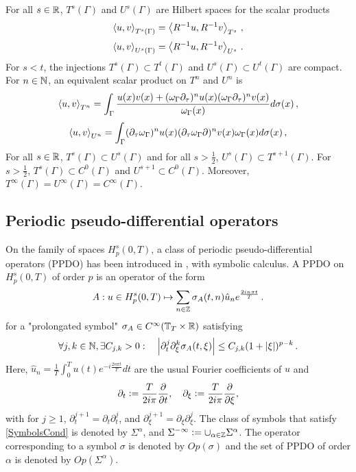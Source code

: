 \documentclass[a4paper]{article}
\begin{document}
\begin{The} For all $s \in \mathbb{R}$, $T^s(\Gamma)$ and $U^s(\Gamma)$ are Hilbert spaces for the scalar products 
\[\left\langle u,v\right\rangle_{T^s(\Gamma)} = \left\langle R^{-1}u,R^{-1}v\right\rangle_{T^s}\,,\]
\[\left\langle u,v\right\rangle_{U^s(\Gamma)} = \left\langle R^{-1}u,R^{-1}v\right\rangle_{U^s}\,.\]
For $s < t$, the injections $T^s(\Gamma) \subset T^t(\Gamma)$ and $U^s(\Gamma) \subset U^t(\Gamma)$ are compact. For $n \in \mathbb{N}$, an equivalent scalar product on $T^n$ and $U^n$ is 
\[\left\langle u,v\right\rangle_{T^n} = \int_{\Gamma} \frac{u(x)v(x) + (\omega_\Gamma \partial_\tau)^n u(x) (\omega_\Gamma \partial_\tau)^n v(x)}{\omega_\Gamma(x)}d\sigma(x)\,,\]
\[\left\langle u,v\right\rangle_{U^n} = \int_{\Gamma}(\partial_\tau\omega_\Gamma )^n u(x) (\partial_\tau\omega_\Gamma \partial)^n v(x)\omega_\Gamma(x)d\sigma(x)\,,\]
For all $s \in \mathbb{R}$, $T^s(\Gamma) \subset U^s(\Gamma)$ and for all $s > \frac{1}{2}$, $U^s(\Gamma) \subset T^{s+1}(\Gamma)$. For $s > \frac{1}{2}$, $T^s(\Gamma) \subset C^0(\Gamma)$ and $U^{s+1} \subset C^0(\Gamma)$. Moreover, $T^\infty(\Gamma) = U^\infty(\Gamma) = C^\infty(\Gamma)$. 
\end{The}

\subsection{Periodic pseudo-differential operators}

On the family of spaces $H^s_p(0,T)$, a class of periodic pseudo-differential operators (PPDO) has been introduced in \cite{thrunen1998symbol}, with symbolic calculus. A PPDO on $H^s_p(0,T)$ of order $p$ is an operator of the form 
\[A : u \in H^s_p(0,T) \mapsto \sum_{n \in \mathbb{Z}} \sigma_A(t,n) \hat{u}_n e^{\frac{2in\pi t}{T} }\,.\]
for a "prolongated symbol" $\sigma_A \in C^{\infty}(\mathbb{T}_T \times \mathbb{R})$ satisfying 
\begin{equation}
\label{SymbolsCond}
	\forall j,k \in \mathbb{N}, \exists C_{j,k} >0 : \quad \left\lvert \partial_t^j \partial_\xi^k \sigma_A(t,\xi) \right\rvert \leq C_{j,k}(1 + \left\lvert \xi \right\rvert)^{p - k}\,.
\end{equation}
Here, $\hat{u}_n = \frac{1}{T}\int_{0}^{T}u(t) e^{-i\frac{2n\pi t}{T}}dt$ are the usual Fourier coefficients of $u$ and 
$${\partial_t \mathrel{\mathop:}= \frac{T}{2i\pi}\frac{\partial}{\partial t}}, \quad  \partial_\xi \mathrel{\mathop:}= \frac{T}{2i\pi}\frac{\partial}{\partial \xi},$$ 
with for $j \geq 1$, $\partial_t^{j+1} = \partial_t \partial_t^j$, and $\partial_\xi^{j+1} = \partial_\xi \partial_\xi^j$. 
The class of symbols that satisfy \eqref{SymbolsCond} is denoted by $\Sigma^\alpha$, and $\Sigma^{-\infty} \mathrel{\mathop:}= \cup_{\alpha \in \mathbb{Z}} \Sigma^\alpha$. The operator corresponding to a symbol $\sigma$ is denoted by $\textit{Op}(\sigma)$ and the set of PPDO of order $\alpha$ is denoted by $\textit{Op}(\Sigma^\alpha)$. 
\end{document}
